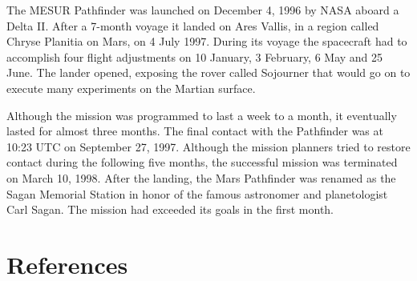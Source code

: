 The MESUR Pathfinder was launched on December 4, 1996 by NASA aboard a
Delta II. After a 7-month voyage it landed on Ares Vallis, in a region
called Chryse Planitia on Mars, on 4 July 1997. During its voyage the
spacecraft had to accomplish four flight adjustments on 10 January, 3
February, 6 May and 25 June. The lander opened, exposing the rover
called Sojourner that would go on to execute many experiments on the
Martian surface.

Although the mission was programmed to last a week to a month, it
eventually lasted for almost three months. The final contact with the
Pathfinder was at 10:23 UTC on September 27, 1997. Although the mission
planners tried to restore contact during the following five months, the
successful mission was terminated on March 10, 1998. After the landing,
the Mars Pathfinder was renamed as the Sagan Memorial Station in honor
of the famous astronomer and planetologist Carl Sagan. The mission had
exceeded its goals in the first month.

\section{References}\label{references}
